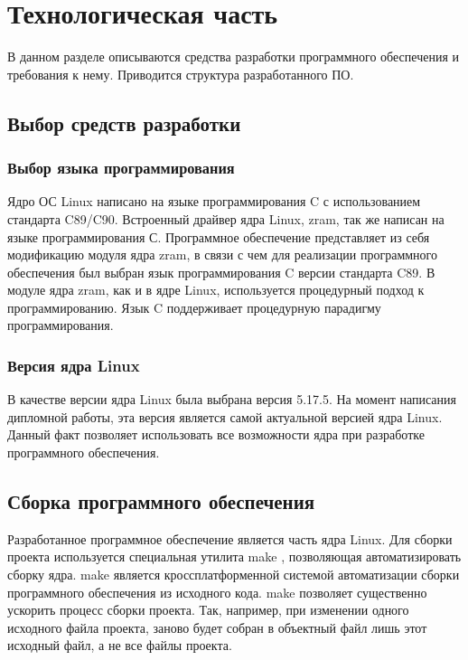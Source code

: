 \section{Технологическая часть}

В данном разделе описываются средства разработки программного обеспечения и требования к нему. Приводится структура разрабо­танного ПО.

\subsection{Выбор средств разработки}

\subsubsection{Выбор языка программирования}

Ядро ОС Linux написано на языке программирования C \cite{C89} с использованием стандарта C89/C90. Встроенный драйвер ядра Linux, zram, так же написан на языке программирования С. Программное обеспечение представляет из себя модификацию модуля ядра zram, в связи с чем для реализации программного обеспечения был выбран язык программирования C версии стандарта C89. В модуле ядра zram, как и в ядре Linux, используется процедурный подход к программированию. Язык C поддерживает процедурную парадигму программирования.

\subsubsection{Версия ядра Linux}

В качестве версии ядра Linux была выбрана версия 5.17.5. На момент написания дипломной работы, эта версия является самой актуальной версией ядра Linux. Данный факт позволяет использовать все возможности ядра при разработке программного обеспечения. 

\subsection{Сборка программного обеспечения}

Разработанное программное обеспечение является часть ядра Linux. Для сборки проекта используется специальная утилита make \cite{make}, позволяющая автоматизировать сборку ядра. make является кроссплатформенной системой автоматизации сборки программного обеспечения из исходного кода. make позволяет существенно ускорить процесс сборки проекта. Так, например, при изменении одного исходного файла проекта, заново будет собран в объектный файл лишь этот исходный файл, а не все файлы проекта.

